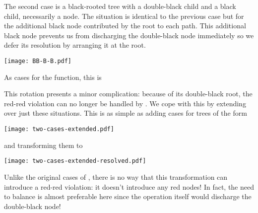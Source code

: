 \documentclass[preprint]{sigplanconf}
\begin{document}
The second case is a black-rooted tree with a double-black child and a black child, necessarily a node. The situation is identical to the previous case but for the additional black node contributed by the root to each path. This additional black node prevents us from discharging the double-black node immediately so we defer its resolution by arranging it at the root.
\begin{center}
\texttt{[image: BB-B-B.pdf]}
\end{center}
As cases for the  function, this is
\begin{schemedisplay}
[(B (BB? a-x-b) y (B c z d))
 (balance (BB (R (-B a-x-b) y c) z d))]
[(B (B a x b) y (BB? c-z-d))
 (balance (BB a x (R b y (-B c-z-d))))]
\end{schemedisplay}
This rotation presents a minor complication: because of its double-black root, the red-red violation can no longer be handled by . We cope with this by extending  over just these situations. This is as simple as adding cases for trees of the form
\begin{center}
\texttt{[image: two-cases-extended.pdf]}
\end{center}
and transforming them to
\begin{center}
\texttt{[image: two-cases-extended-resolved.pdf]}
\end{center}
Unlike the original cases of , there is no way that this transformation can introduce a red-red violation: it doesn't introduce any red nodes! In fact, the need to balance is almost preferable here since the operation itself would discharge the double-black node!
\end{document}
